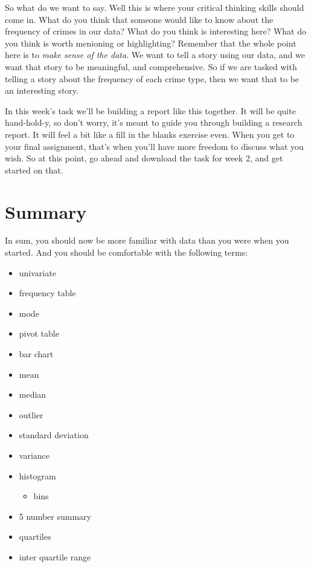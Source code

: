 \documentclass[
]{book}
\providecommand{\tightlist}{%
  \setlength{\itemsep}{0pt}\setlength{\parskip}{0pt}}
\begin{document}
So what do we want to say. Well this is where your critical thinking skills should come in. What do you think that someone would like to know about the frequency of crimes in our data? What do you think is interesting here? What do you think is worth menioning or highlighting? Remember that the whole point here is to \emph{make sense of the data}. We want to tell a story using our data, and we want that story to be meaningful, and comprehensive. So if we are tasked with telling a story about the frequency of each crime type, then we want that to be an interesting story.

In this week's task we'll be building a report like this together. It will be quite hand-hold-y, so don't worry, it's meant to guide you through building a research report. It will feel a bit like a fill in the blanks exercise even. When you get to your final assignment, that's when you'll have more freedom to discuss what you wish. So at this point, go ahead and download the task for week 2, and get started on that.

\hypertarget{summary-1}{%
\section{Summary}\label{summary-1}}

In sum, you should now be more familiar with data than you were when you started. And you should be comfortable with the following terms:

\begin{itemize}
\tightlist
\item
  univariate
\item
  frequency table
\item
  mode
\item
  pivot table
\item
  bar chart
\item
  mean
\item
  median
\item
  outlier
\item
  standard deviation
\item
  variance
\item
  histogram

  \begin{itemize}
  \tightlist
  \item
    bins
  \end{itemize}
\item
  5 number summary
\item
  quartiles
\item
  inter quartile range
\end{itemize}
\end{document}
